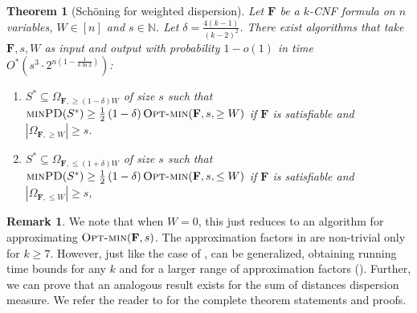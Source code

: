\documentclass[11pt, letterpaper]{article}
\newtheorem{theorem}{Theorem}
\theoremstyle{definition}
\newtheorem{remark}{Remark}
\newcommand{\f}{\mathbf{F}}
\newcommand{\PD}{\textsc{minPD}}
\newcommand{\optm}{\textsc{Opt-min}}
\newcommand{\sch}{Sch\"{o}ning\xspace}
\newcommand{\IN}{\ensuremath{\mathbb{N}}}
\begin{document}
\begin{theorem}[\sch for weighted dispersion] \label{thm:schheavyeasy}
    Let $\f$ be a $k$-CNF formula on $n$ variables, $W \in [n]$ and $s \in \IN$. Let $\delta = \frac{4(k-1)}{(k-2)^2}$. There exist algorithms that take $\f,s,W$ as input and output with probability $1-o(1)$ in time $O^*\left(s^3 \cdot 2^{n(1-\frac{1}{k \ln 2})}\right)$:
    \begin{enumerate}
        \item $S^* \subseteq \Omega_{\f, \geq (1-\delta) W}$ of size $s$ such that 
        $\PD(S^*) \geq \frac{1}{2}\left(1-\delta \right) \optm(\f,s, \geq W)$ if $\f$ is satisfiable and $|\Omega_{\f, \geq W}| \geq s$. 
        \item  $S^* \subseteq \Omega_{\f, \leq (1+\delta) W}$ of size $s$ such that 
        $\PD(S^*) \geq \frac{1}{2}\left(1-\delta \right) \optm(\f,s, \leq W)$ if $\f$ is satisfiable and $|\Omega_{\f, \leq W}| \geq s$,

    \end{enumerate}
\end{theorem}
\begin{remark}
    We note that when $W=0$, this just reduces to an algorithm for approximating $\optm(\f,s)$. The approximation factors in  are non-trivial only for $k \geq 7$. However, just like the case of ,  can be generalized, obtaining running time bounds for any $k$ and for a larger range of approximation factors (). Further, we can prove that an analogous result exists for the sum of distances dispersion measure. We refer the reader to  for the complete theorem statements and proofs. 
\end{remark}
\end{document}
